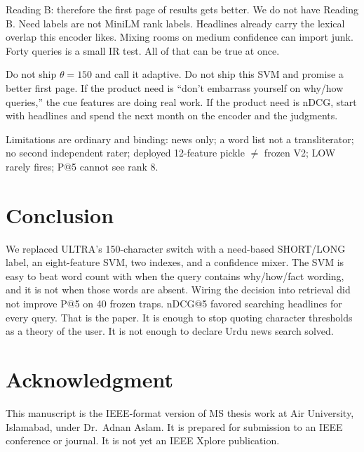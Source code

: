 \documentclass[conference]{IEEEtran}
\begin{document}
Reading B: therefore the first page of results gets better. We do not have Reading B. Need labels are not MiniLM rank labels. Headlines already carry the lexical overlap this encoder likes. Mixing rooms on medium confidence can import junk. Forty queries is a small IR test. All of that can be true at once.

Do not ship $\theta=150$ and call it adaptive. Do not ship this SVM and promise a better first page. If the product need is ``don't embarrass yourself on why/how queries,'' the cue features are doing real work. If the product need is nDCG, start with headlines and spend the next month on the encoder and the judgments.

Limitations are ordinary and binding: news only; a word list not a transliterator; no second independent rater; deployed 12-feature pickle $\neq$ frozen V2; LOW rarely fires; P@5 cannot see rank 8.

\section{Conclusion}

We replaced ULTRA's 150-character switch with a need-based SHORT/LONG label, an eight-feature SVM, two indexes, and a confidence mixer. The SVM is easy to beat word count with when the query contains why/how/fact wording, and it is not when those words are absent. Wiring the decision into retrieval did not improve P@5 on 40 frozen traps. nDCG@5 favored searching headlines for every query. That is the paper. It is enough to stop quoting character thresholds as a theory of the user. It is not enough to declare Urdu news search solved.

\section*{Acknowledgment}

This manuscript is the IEEE-format version of MS thesis work at Air University, Islamabad, under Dr.\ Adnan Aslam. It is prepared for submission to an IEEE conference or journal. It is not yet an IEEE Xplore publication.
\end{document}
